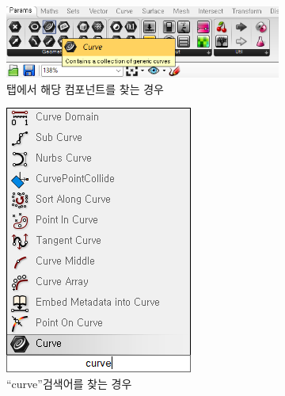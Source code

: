 \documentclass[11pt]{article}
\begin{document}
\begin{figure}[H]
    \centering
    \begin{subfigure}{\textwidth}
        \centering
        \includegraphics[width=.6\textwidth]{./img/mbs_08_curvAtTab.png}
        \caption{탭에서 해당 컴포넌트를 찾는 경우}
        \label{fig:mbs_08_curveAtTab}
    \end{subfigure}
    \begin{subfigure}{0.35\textwidth}
        \centering
        \includegraphics[width=.7\textwidth]{./img/mbs_08_curve.png}
        \caption{``curve''검색어를 찾는 경우}
        \label{fig:mbs_08_curve}
    \end{subfigure}
    \begin{subfigure}{0.35\textwidth}
        \centering

\end{subfigure}
\end{figure}
\end{document}
